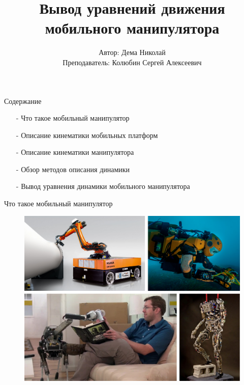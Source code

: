 \documentclass[newPxFont,numfooter,sectionpages]{beamer}
\title{Вывод уравнений движения мобильного манипулятора}
\subtitle{}
\author{Автор: Дема Николай\\Преподаватель: Колюбин Сергей Алексеевич}
\institute{\small{Курс: Динамика Робототехнических систем\\ \ Университет ИТМО}}
\begin{document}
\maketitle

\begin{frame}{Содержание}
	\tableofcontents[hideallsubsections]
	\begin{itemize}
		\item[-] Что такое мобильный манипулятор 
        \item[-] Описание кинематики мобильных платформ
        \item[-] Описание кинематики манипулятора
        \item[-] Обзор методов описания динамики
        \item[-] Вывод уравнения динамики мобильного манипулятора	
	\end{itemize}	
\end{frame}

\begin{frame}{Что такое мобильный манипулятор}
	\begin{figure}[H]
		\center
		\renewcommand{\figurename}{}
		\includegraphics[width=0.9\linewidth]{pic/mm_all.png}
		\label{fig:scr1}
	\end{figure}
\end{frame}
\end{document}
